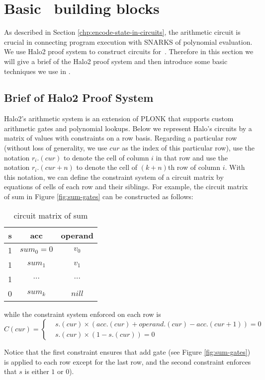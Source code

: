 \section{Basic \zkwasm\, building blocks}
As described in Section \ref{chp:encode-state-in-circuits}, the arithmetic circuit is crucial in connecting program execution with SNARKS of polynomial evaluation. We use Halo2 proof system to construct circuits for \zkwasm\,.  Therefore in this section we will give a brief of the Halo2 proof system and then introduce some basic techniques we use in \zkwasm.
\subsection{Brief of Halo2 Proof System}
\label{chp:constraint-system}
Halo2's arithmetic system is an extension of PLONK that supports custom arithmetic gates and polynomial lookups. Below we represent Halo's circuits by a matrix of values with constraints on a row basis. Regarding a particular row (without loss of generality, we use $cur$ as the index of this particular row), use the notation $r_i.(cur)$ to denote the cell of column $i$ in that row and use the notation $r_i.(cur + n)$ to denote the cell of $(k+n)$th row of column $i$. With this notation, we can define the constraint system of a circuit matrix by equations of cells of each row and their siblings. For example, the circuit matrix of sum in Figure \ref{fig:sum-gates} can be constructed as follows:

\begin{table}[!h]
\begin{center}
\begin{tabular}{ | c | c | c |}
  \hline
  s & acc & operand \\ 
  \hline
 1 & $sum_0 = 0$ & $v_0$\\
 \hline
 1 & $sum_1$ & $v_1$\\
 \hline
 1 & $\cdots$ & $\cdots$\\
 \hline
 0 & $sum_k$ & $nill$\\
 \hline
\end{tabular}
\caption{circuit matrix of sum}
\label{tbl:sum-table}
\end{center}
\end{table}

\noindent while the constraint system enforced on each row is
\[
 C(cur) = \begin{cases}
     &s.(cur) \times (acc.(cur) + operand.(cur) - acc.(cur+1)) = 0 \\
     &s.(cur) \times (1-s.(cur)) = 0
 \end{cases}
\]
\begin{remark}
Notice that the first constraint ensures that add gate (see Figure \ref{fig:sum-gates}) is applied to each row except for the last row, and the second constraint enforces that $s$ is either $1$ or $0$).
\end{remark}

